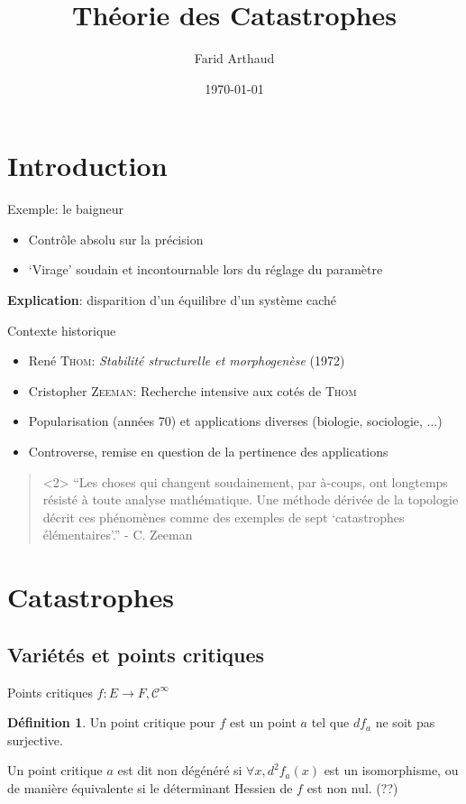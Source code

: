 \documentclass{beamer}
\author{Farid Arthaud}
\title{Théorie des Catastrophes}
\date{\today}
\newcommand{\cinf}{\mathcal{C}^\infty}
\theoremstyle{definition}
\newtheorem{defn}{Définition}
\begin{document}
\frame{\titlepage}

\frame{\tableofcontents}

\section*{Introduction}
\begin{frame}{Exemple: le baigneur}
    \begin{itemize}
        \item Contrôle absolu sur la précision
        \item `Virage' soudain et incontournable lors du réglage du paramètre
        \pause
    \end{itemize}
    \textbf{Explication}: disparition d'un équilibre d'un système caché
\end{frame}

\begin{frame}{Contexte historique}
    \begin{itemize}
        \item René \textsc{Thom}: \textit{Stabilité structurelle et morphogenèse} (1972)
        \item Cristopher \textsc{Zeeman}: Recherche intensive aux cotés de \textsc{Thom}
        \item Popularisation (années 70) et applications diverses (biologie, sociologie, ...)
        \item Controverse, remise en question de la pertinence des applications
    \end{itemize}
    \begin{quote}<2>
        ``Les choses qui changent soudainement, par à-coups, ont longtemps résisté à toute analyse mathématique.
        Une méthode dérivée de la topologie décrit ces phénomènes comme des exemples de sept `catastrophes élémentaires'.'' - C. Zeeman
    \end{quote}
\end{frame}

\section{Catastrophes}
\subsection{Variétés et points critiques}
\begin{frame}{Points critiques}
    $f: E \to F, \cinf$
    \begin{defn}
        Un point critique pour $f$ est un point $a$ tel que $df_a$ ne soit pas surjective.

	    Un point critique $a$ est dit non dégénéré si $\forall x, d^2f_a(x)$ est un isomorphisme, ou de manière équivalente si le déterminant Hessien de $f$ est non nul. (??)
    \end{defn}
\end{frame}
\end{document}
